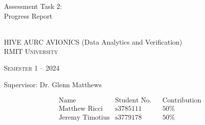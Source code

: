 \documentclass[a4paper, oneside]{memoir}
\newcommand*{\semester}[2]{Semester #1 -- #2} %
\newcommand*{\student}[3]{&\text{#1} &\text{#2} &&\text{#3}} %
\newcommand*{\titleAM}[4]%
{\begingroup
  \centering
  {\Huge Assessment Task #2:\\#3\par}\\[\baselineskip]
  {\Large HIVE AURC AVIONICS (Data Analytics and Verification)}\\[\baselineskip]
  {\small\scshape RMIT University}\par
  {\small\scshape #4}\par\vspace{0.5em}
  {\large Supervisor: #1}\par\vspace{0.5em}
  \endgroup}
\begin{document}
  \titleAM{Dr. Glenn Matthews}{2}{Progress Report}{\semester{1}{2024}}
  \begin{align*}
    &\text{Name} &\text{Student No.} &&\text{Contribution}\\
    \student{Matthew Ricci}{s3785111}{50\%}\\
    \student{Jeremy Timotius}{s3779178}{50\%}
  \end{align*}
  \tableofcontents*
  \clearpage
  \renewcommand{\abstractname}{Summary}

  \markboth{}{}
  

  
  

  
\end{document}
